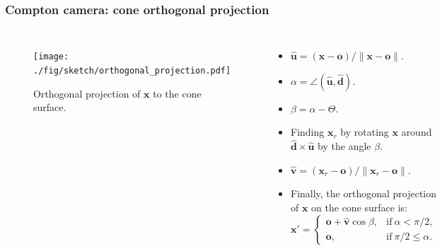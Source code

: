 \documentclass[aspectratio=169]{beamer}
\begin{document}


\begin{frame}[noframenumbering]
\frametitle{Compton camera: cone orthogonal projection}

\begin{columns}[c]

  \begin{figure}
    \centering
    \texttt{[image: ./fig/sketch/orthogonal\_projection.pdf]}
    \caption{Orthogonal projection of $\mathbf{x}$ to the cone surface.}
    \label{fig:orthogonal_projection}
  \end{figure}


\begin{itemize}
 \item $\mathbf{\hat{u}} = (\mathbf{x} - \mathbf{o})/\|\mathbf{x} - \mathbf{o}\|$.

 \item $\alpha = \angle(\mathbf{\hat{u}}, \mathbf{\hat{d}})$.

 \item $\beta = \alpha - \Theta$.

 \item Finding $\mathbf{x}_r$ by rotating $\mathbf{x}$ around $\mathbf{\hat{d}} \times \mathbf{\hat{u}}$ by the angle $\beta$.

 \item $\mathbf{\hat{v}} = (\mathbf{x}_r - \mathbf{o})/\|\mathbf{x}_r - \mathbf{o}\|$.

 \item Finally, the orthogonal projection of $\mathbf{x}$ on the cone surface is:
   $$
   \mathbf{x}' = \begin{cases}
     \mathbf{o} + \mathbf{\hat{v}}\cos\beta, & \text{if}\ \alpha < \pi/2,\\
     \mathbf{o}, & \text{if}\ \pi/2 \leq \alpha.
   \end{cases}
   $$
\end{itemize}

\end{columns}

\end{frame}


\end{document}
